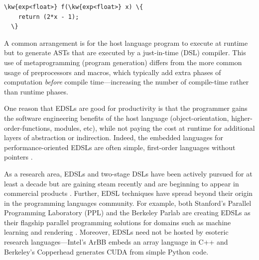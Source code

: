 \vspace{1mm}
\begin{Verbatim}[commandchars=\\\{\}]
  \kw{exp<float>} f(\kw{exp<float>} x) \{
    return (2*x - 1);
  \}
\end{Verbatim}

A common arrangement is for the host language program to execute at
runtime but to generate ASTs that are executed by a just-in-time
(DSL) compiler.  This use of metaprogramming (program generation)
differs from the more common usage of preprocessors and 
macros, which typically add extra
phases of computation {\em before}  compile time---increasing
the number of compile-time rather than runtime phases.



One reason that EDSLs are good for productivity is that the programmer
gains the software engineering benefits of the host language
(object-orientation, higher-order-functions, modules, etc), while not
paying the cost at runtime for additional layers of abstraction or
indirection.  Indeed, the embedded languages for 
performance-oriented EDSLs are often simple, first-order
languages without pointers \cite{wavescript, ACCELERATEDAMP11}.


As a research area, EDSLs and two-stage DSLs have been actively pursued for at least a
decade \cite{VERTIGO, wavescript} but are gaining steam
recently 
\cite{copperhead, stanford-ppl} 
and are beginning to appear in
commercial products \cite{ArBB}.
%
Further, EDSL techniques have spread beyond their origin in 
 the programming languages community.
% 
For example, both Stanford's Parallel Programming Laboratory (PPL) and
the Berkeley Parlab are creating EDSLs as their flagship parallel
programming solutions for domains such as machine learning and
rendering \cite{stanford-ppl}.
  Moreover, EDSLs need not be hosted by esoteric research languages---Intel's
 ArBB embeds an array language in C++ and Berkeley's
Copperhead \cite{copperhead} generates CUDA from simple Python code.


